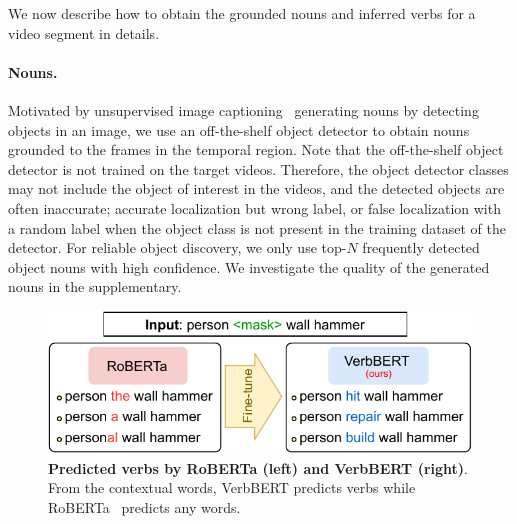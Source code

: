 We now describe how to obtain the {grounded} nouns and {inferred} verbs for a video segment in details.

\vspace{-1em}\paragraph{Nouns.}
Motivated by unsupervised image captioning~\cite{Feng2019UnsupervisedIC,laina2019towards} generating nouns by detecting objects in an image, we use an off-the-shelf object detector to obtain nouns grounded to the frames in the temporal region. 
Note that the off-the-shelf object detector is not trained on the target videos. 
Therefore, the object detector classes may not include the object of interest in the videos, and the detected objects are often inaccurate; accurate localization but wrong label, or false localization with a random label when the object class is not present in the training dataset of the detector.
For reliable object discovery, we only use top-$N$ frequently detected object nouns with high confidence.
We investigate the quality of the generated nouns in the supplementary.



\begin{figure}[t]
    \centering
    \includegraphics[width=0.95\linewidth]{figures/finetune_verbbert_new.pdf}
    \caption{\textbf{Predicted verbs by RoBERTa (left) and VerbBERT (right)}. From the contextual words, VerbBERT predicts verbs while RoBERTa~\cite{roberta} predicts any words.}
    \vspace{-0.8em}
    \label{fig:action_ft}
\end{figure}

